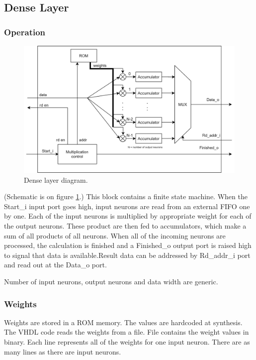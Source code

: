 \subsection{Dense Layer}

\subsubsection{Operation}
\begin{figure}[h]
	\centering
	\includegraphics[width=1\textwidth]{img/blockDiagramDense.png}
	\caption[Dense layer diagram]{Dense layer diagram.}
	\label{FIG:denseLayerBlockDiagram}
\end{figure}


(Schematic is on figure \ref{FIG:denseLayerBlockDiagram}.)
This block contains a finite state machine. When the Start\_i input port goes high, input neurons are read from an external FIFO one by one. Each of the input neurons is multiplied by appropriate weight for each of the output neurons. These product are then fed to accumulators, which make a sum of all products of all neurons. When all of the incoming neurons are processed, the calculation is finished and a Finished\_o output port is raised high to signal that data is available.Result data can be addressed by Rd\_addr\_i port and read out at the Data\_o port.


Number of input neurons, output neurons and data width are generic. 

\subsubsection{Weights}

Weights are stored in a ROM memory. The values are hardcoded at synthesis. The VHDL code reads the weights from a file. File contains the weight values in binary. Each line represents all of the weights for one input neuron. There are as many lines as there are input neurons.

